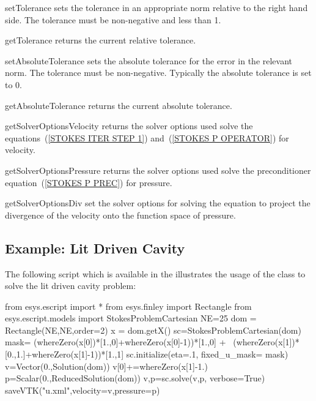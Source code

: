 \begin{methoddesc}[StokesProblemCartesian]{setTolerance}{}
sets the tolerance in an appropriate norm relative to the right hand side. The tolerance must be non-negative and less than 1.
\end{methoddesc}
\begin{methoddesc}[StokesProblemCartesian]{getTolerance}{}
returns the current relative tolerance.
\end{methoddesc}
\begin{methoddesc}[StokesProblemCartesian]{setAbsoluteTolerance}{}
sets the absolute tolerance for the error in the relevant norm. The tolerance must be non-negative. Typically the
absolute tolerance is set to 0.
\end{methoddesc}

\begin{methoddesc}[StokesProblemCartesian]{getAbsoluteTolerance}{}
returns the current absolute tolerance.
\end{methoddesc}

\begin{methoddesc}[StokesProblemCartesian]{getSolverOptionsVelocity}{}
returns the solver options used  solve the equations~(\ref{STOKES ITER STEP 1}) and~(\ref{STOKES P OPERATOR}) for velocity.
\end{methoddesc}

\begin{methoddesc}[StokesProblemCartesian]{getSolverOptionsPressure}{}
returns the solver options used solve the preconditioner equation~(\ref{STOKES P PREC}) for pressure.
\end{methoddesc}

\begin{methoddesc}[StokesProblemCartesian]{getSolverOptionsDiv}{}
set the solver options for solving the equation to project the divergence of the velocity onto the function space of pressure.
\end{methoddesc}


\subsection{Example: Lit Driven Cavity}
 The following script  
 which is available in the \ExampleDirectory
illustrates the usage of the  class to solve
the lit driven cavity problem:
\begin{python}
from esys.escript import *
from esys.finley import Rectangle
from esys.escript.models import StokesProblemCartesian
NE=25
dom = Rectangle(NE,NE,order=2)
x = dom.getX()
sc=StokesProblemCartesian(dom)
mask= (whereZero(x[0])*[1.,0]+whereZero(x[0]-1))*[1.,0] + \
      (whereZero(x[1])*[0.,1.]+whereZero(x[1]-1))*[1.,1]
sc.initialize(eta=.1, fixed_u_mask= mask)
v=Vector(0.,Solution(dom))
v[0]+=whereZero(x[1]-1.)
p=Scalar(0.,ReducedSolution(dom))
v,p=sc.solve(v,p, verbose=True)
saveVTK("u.xml",velocity=v,pressure=p)
\end{python}
